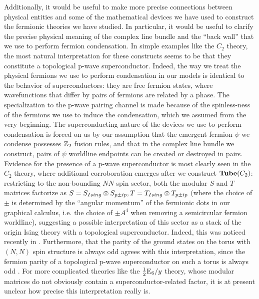 Additionally, it would be useful to make more precise connections between physical entities and some of the mathematical 
devices we have used to construct the fermionic theories 
we have studied. 
In particular, it would be useful to clarify the precise physical meaning of the complex line bundle 
and the ``back wall'' that we use to perform fermion condensation. 
In simple examples like the $C_2$ theory, the most natural interpretation for these constructs 
seems to be that they constitute a topological p-wave superconductor.
Indeed, the way we treat the physical fermions we use to perform condensation 
in our models is identical to the behavior of 
superconductors: they are 
free fermion states, 
where wavefunctions that differ by pairs of 
fermions are related by a phase. 
The specialization to the p-wave pairing channel is made because of the spinless-ness
of the fermions we use to induce the condensation, which we assumed from the very 
beginning.  
The superconducting nature of the devices we use to perform condensation is forced on us
by our assumption that the emergent fermion $\psi$ we condense possesses $\mathbb{Z}_2$
fusion rules, and that in the complex line bundle we construct, pairs of
$\psi$ worldline endpoints can be created or destroyed in pairs. 
Evidence for the presence of a p-wave superconductor is most clearly seen in the $C_2$ theory, 
where additional corroboration emerges after we construct $\textbf{Tube}(C_2)$: 
restricting to the non-bounding $NN$ spin sector, both the modular $S$ and $T$ matrices 
factorize as $S=S_{Ising}\otimes S_{p\pm ip}, T = T_{Ising} \otimes T_{p\pm ip}$ (where the 
choice of $\pm$ is determined by the ``angular momentum'' of the fermionic dots 
in our graphical calculus, i.e. the choice of $\pm A^4$ when removing a semicircular fermion
worldline), suggesting a possible interpretation of this sector 
as a stack of the origin Ising theory with a topological superconductor. 
Indeed, this was noticed recently in \cite{ware2016}.
Furthermore, that the parity of the ground states on the torus with $(N,N)$ spin structure is always 
odd agrees with this interpretation, since the fermion parity of a topological 
p-wave superconductor on such a torus is always odd \cite{you2015}.
For more
complicated theories like the $\frac{1}{2}\text{E}_6/y$ theory, whose modular matrices do not obviously contain a superconductor-related factor, 
it is at present unclear how precise this interpretation really is. 

